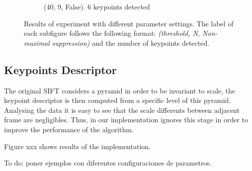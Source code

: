 \begin{figure}[h!]
\begin{subfigure}{0.5\textwidth}
  \caption{(40, 9, False). 6 keypoints detected}
\end{subfigure}
 \caption{Results of experiment with different parameter settings. The label of each subfigure follows the following format: \textit{(threshold, N, Non-maximal suppression)} and the number of keypoints detected.}
\label{fig:keypoints}
\end{figure}


\subsection{Keypoints Descriptor}

The original SIFT considers a pyramid in order to be invariant to scale, the keypoint descriptor is then computed from a specific level of this pyramid. Analysing the data it is easy to see that the scale differents between adjacent frame are negligibles. Thus, in our implementation ignores this stage in order to improve the performance of the algorithm.

Figure xxx shows results of the implementation.

To do: poner ejemplos con diferentes configuraciones de parametros.
